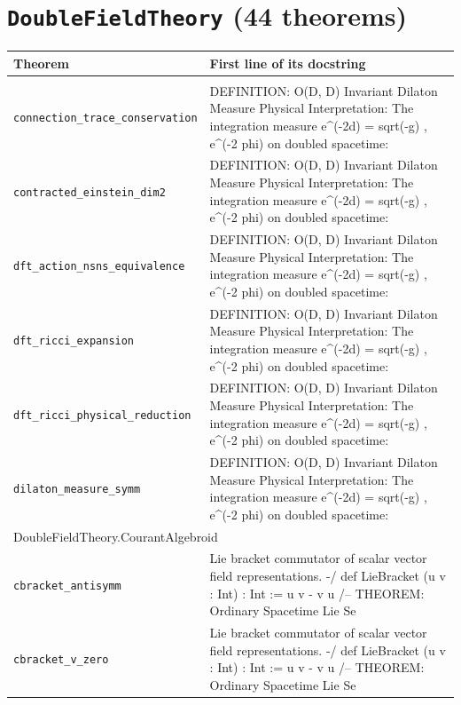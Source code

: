 \section*{\texttt{DoubleFieldTheory} (44 theorems)}
\begin{longtable}{p{}p{}}\toprule Theorem & First line of its docstring \\ \midrule\endhead\bottomrule\endfoot
\multicolumn{2}{l}{\textsf{\small DoubleFieldTheory.ActionCurvature}} \\
\quad\texttt{\footnotesize connection\_trace\_conservation} & {\footnotesize DEFINITION: O(D, D) Invariant Dilaton Measure Physical Interpretation: The integration measure e\^{}(-2d) =  sqrt(-g)  , e\^{}(-2 phi) on doubled spacetime:} \\
\quad\texttt{\footnotesize contracted\_einstein\_dim2} & {\footnotesize DEFINITION: O(D, D) Invariant Dilaton Measure Physical Interpretation: The integration measure e\^{}(-2d) =  sqrt(-g)  , e\^{}(-2 phi) on doubled spacetime:} \\
\quad\texttt{\footnotesize dft\_action\_nsns\_equivalence} & {\footnotesize DEFINITION: O(D, D) Invariant Dilaton Measure Physical Interpretation: The integration measure e\^{}(-2d) =  sqrt(-g)  , e\^{}(-2 phi) on doubled spacetime:} \\
\quad\texttt{\footnotesize dft\_ricci\_expansion} & {\footnotesize DEFINITION: O(D, D) Invariant Dilaton Measure Physical Interpretation: The integration measure e\^{}(-2d) =  sqrt(-g)  , e\^{}(-2 phi) on doubled spacetime:} \\
\quad\texttt{\footnotesize dft\_ricci\_physical\_reduction} & {\footnotesize DEFINITION: O(D, D) Invariant Dilaton Measure Physical Interpretation: The integration measure e\^{}(-2d) =  sqrt(-g)  , e\^{}(-2 phi) on doubled spacetime:} \\
\quad\texttt{\footnotesize dilaton\_measure\_symm} & {\footnotesize DEFINITION: O(D, D) Invariant Dilaton Measure Physical Interpretation: The integration measure e\^{}(-2d) =  sqrt(-g)  , e\^{}(-2 phi) on doubled spacetime:} \\
\multicolumn{2}{l}{\textsf{\small DoubleFieldTheory.CourantAlgebroid}} \\
\quad\texttt{\footnotesize cbracket\_antisymm} & {\footnotesize Lie bracket commutator of scalar vector field representations. -/ def LieBracket (u v : Int) : Int := u v - v u /-- THEOREM: Ordinary Spacetime Lie Se} \\
\quad\texttt{\footnotesize cbracket\_v\_zero} & {\footnotesize Lie bracket commutator of scalar vector field representations. -/ def LieBracket (u v : Int) : Int := u v - v u /-- THEOREM: Ordinary Spacetime Lie Se} \\

\end{longtable}
